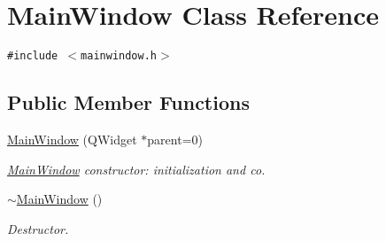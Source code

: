 \hypertarget{class_main_window}{
\section{MainWindow Class Reference}
\label{class_main_window}
}
{\tt \#include $<$mainwindow.h$>$}

\subsection*{Public Member Functions}
\begin{CompactItemize}
\item 
\hyperlink{class_main_window_8b244be8b7b7db1b08de2a2acb9409db}{MainWindow} (QWidget $\ast$parent=0)
\begin{CompactList}\small\item\em \hyperlink{class_main_window}{MainWindow} constructor: initialization and co. \item\end{CompactList}\item 
\hyperlink{class_main_window_e98d00a93bc118200eeef9f9bba1dba7}{$\sim$MainWindow} ()
\begin{CompactList}\small\item\em Destructor. \item\end{CompactList}\end{CompactItemize}
